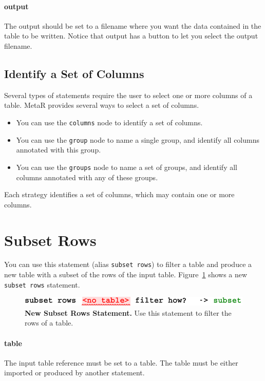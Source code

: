 \paragraph{output}
The output should be set to a filename where you want the data contained in the table to be written. Notice that output has a button to let you select the output filename.

\subsection{Identify a Set of Columns}\label{subsec:KeySelectionDescription}
Several types of statements require the user to select one or more columns of a table. MetaR provides several ways to select a set of columns. 
\begin{itemize}
  \item You can use the \texttt{columns} node to identify a set of columns. 
  \item You can use the \texttt{group} node to name a single group, and identify all columns annotated with this group.
  \item You can use the \texttt{groups} node to name a set of groups, and identify all columns annotated with any of these groups.
\end{itemize}

\noindent{}Each strategy identifies a set of columns, which may contain one or more columns.

\section{Subset Rows}
You can use this statement (alias \texttt{subset rows}) to filter a table and produce a new table with a subset of the rows of the input table. Figure~\ref{fig:NewSubsetRows} shows a new \texttt{subset rows} statement.

\begin{figure}
  \centering
  \includegraphics[width=\figWidthNarrow]{figures/NewSubsetRowsStatement.pdf}
\caption[New Subset Rows Statement.]{\textbf{New Subset Rows Statement.} Use this statement to filter the rows of a table.}
\label{fig:NewSubsetRows}
\end{figure}

\paragraph{table}
The input table reference must be set to a table. The table must be either imported or produced by another statement.

